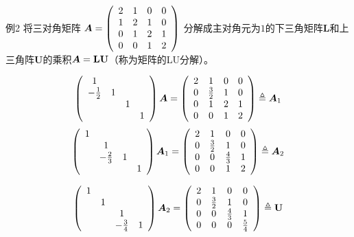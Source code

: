 \begin{frame}
  \begin{footnotesize}
    \begin{exampleblock}{例2}
      将三对角矩阵
      $
      \boldsymbol{A} = \left(
      \begin{array}{cccc}
        2 & 1 & 0 & 0\\
        1 & 2 & 1 & 0\\
        0 & 1 & 2 & 1\\
        0 & 0 & 1 & 2
      \end{array}
      \right)
      $
      分解成主对角元为$1$的下三角矩阵$\mathbf{L}$和上三角阵$\mathbf{U}$的乘积$\boldsymbol{A}=\mathbf{L}\mathbf{U}$（称为矩阵的LU分解）。
    \end{exampleblock}
    \pause 
    \jiename 
    $$
    \left(
    \begin{array}{cccc}
      1 & && \\
      -\frac12 &1&&\\
      &&1&\\
      &&&1
    \end{array}
    \right)\boldsymbol{A} = \left(
    \begin{array}{cccc}
      2 & 1 & 0 & 0\\
      0 & \frac32 & 1 & 0\\
      0 & 1 & 2 & 1\\
      0 & 0 & 1 & 2
    \end{array}
    \right) \triangleq \boldsymbol{A}_1
    $$
    \pause 
    $$
    \left(
    \begin{array}{cccc}
      1 & && \\
      &1&&\\
      &-\frac23&1&\\
      &&&1
    \end{array}
    \right)\boldsymbol{A}_1 = \left(
    \begin{array}{cccc}
      2 & 1 & 0 & 0\\
      0 & \frac32 & 1 & 0\\
      0 & 0 & \frac43 & 1\\
      0 & 0 & 1 & 2
    \end{array}
    \right) \triangleq \boldsymbol{A}_2
    $$
    \pause 

    $$
    \left(
    \begin{array}{cccc}
      1 & && \\
      &1&&\\
      &&1&\\
      &&-\frac34&1
    \end{array}
    \right)\boldsymbol{A}_2 = \left(
    \begin{array}{cccc}
      2 & 1 & 0 & 0\\
      0 & \frac32 & 1 & 0\\
      0 & 0 & \frac43 & 1\\
      0 & 0 & 0  & \frac54
    \end{array}
    \right) \triangleq \mathbf{U}
    $$
  \end{footnotesize}
\end{frame}


